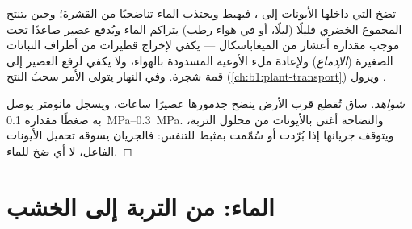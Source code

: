 \begin{proposition}\label{prop:b1:plant-water-minerals:rootpressure}
تضخ   التي داخلها الأيونات إلى ، فيهبط
  ويجتذب الماء تناضحيًا من القشرة؛ وحين يتنتح
المجموع الخضري قليلًا (ليلًا، أو في هواء رطب) يتراكم الماء ويُدفع
عصير  صاعدًا تحت \emph{} موجب مقداره أعشار من
الميغاباسكال --- يكفي لإخراج قطيرات من أطراف  النباتات الصغيرة
(\emph{الإدماع}) ولإعادة ملء الأوعية المسدودة بالهواء، ولا يكفي
لرفع العصير إلى قمة شجرة. وفي النهار يتولى الأمر سحبُ النتح
(\cref{ch:b1:plant-transport}) ويزول .
\end{proposition}
\begin{proof}[شواهد]
ساق تُقطع قرب الأرض ينضح جذمورها عصيرًا ساعات، ويسجل مانومتر يوصل
به ضغطًا مقداره \qtyrange{0.1}{0.3}{MPa}. والنضاحة أغنى بالأيونات
من محلول التربة، ويتوقف جريانها إذا بُرّدت  أو سُمّمت بمثبط
للتنفس: فالجريان يسوقه تحميل الأيونات الفاعل، لا أي ضخ للماء.
\end{proof}

\section{الماء: من التربة إلى الخشب}

